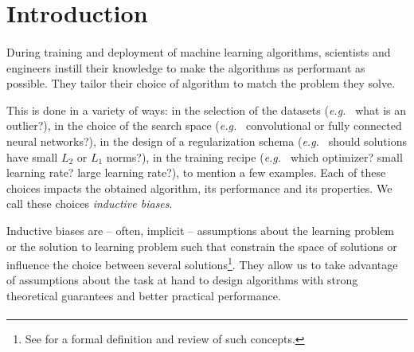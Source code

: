 
\section{Introduction}


\paragraph{}
During training and deployment of machine learning algorithms, scientists and engineers instill their knowledge to make the algorithms as performant as possible. They tailor their choice of algorithm to match the problem they solve.

This is done in a variety of ways: in the selection of the datasets (\emph{e.g.\ } what is an outlier?), in the choice of the search space (\emph{e.g.\ } convolutional or fully connected neural networks?), in the design of a regularization schema (\emph{e.g.\ } should solutions have small $L_2$ or $L_1$ norms?), in the training recipe (\emph{e.g.\ } which optimizer? small learning rate? large learning rate?), to mention a few examples. Each of these choices impacts the obtained algorithm, its performance and its properties. We call these choices \emph{inductive biases}.

Inductive biases are -- often, implicit -- assumptions about the learning problem or the solution to learning problem such that constrain the space of solutions or influence the choice between several solutions\footnote{See \citet{mitchell-inductive,1806.01261} for a formal definition and review of such concepts.}. They allow us to take advantage of assumptions about the task at hand to design algorithms with strong theoretical guarantees and better practical performance.

\paragraph{}

